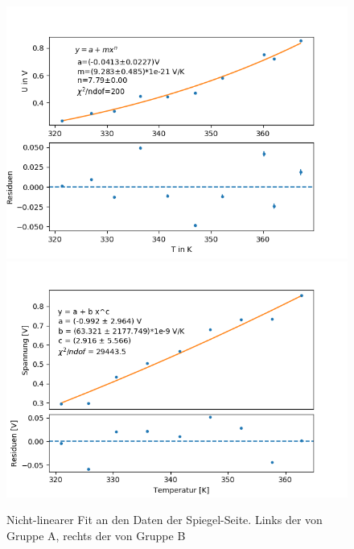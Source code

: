 \documentclass[12pt,a4paper]{article}
\begin{document}
\begin{figure}[H]
\centering
\includegraphics[scale=0.5]{Bilder/nichtlinear_A_spiegel.png}
\includegraphics[scale=0.5]{Bilder/nonlinear_spiegel_B.png}
\caption{Nicht-linearer Fit an den Daten der Spiegel-Seite. Links der von Gruppe A, rechts der von Gruppe B}
\end{figure}
\end{document}
